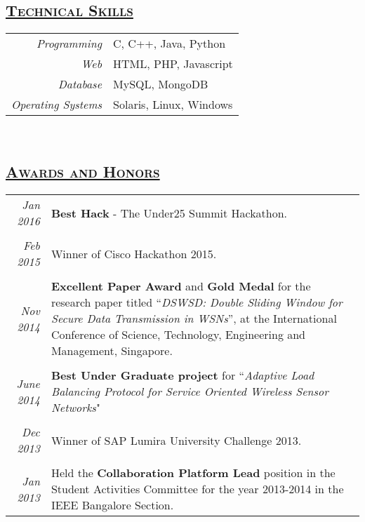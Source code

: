 \documentclass[14pt]{article}
\begin{document}
\subsection* {\scshape\LARGE\uline {Technical Skills}}
\begin{tabular}{r l}
\emph{Programming} & C, C++, Java, Python \\
\emph{Web}              & HTML, PHP, Javascript \\
\emph{Database}	  & MySQL, MongoDB \\
\emph{Operating Systems} & Solaris, Linux, Windows
\end{tabular}
\\
\subsection* {\scshape\LARGE\uline {Awards and Honors}}
\begin{tabularx}{\textwidth}{r X}
\emph{Jan 2016} &  \textbf{Best Hack} - The Under25 Summit Hackathon.\\ \\
\emph{Feb 2015} & Winner of Cisco Hackathon 2015.\\ \\
\emph{Nov 2014} & \textbf{Excellent Paper Award} and \textbf{Gold Medal} for the research paper  titled ``\emph{DSWSD: Double Sliding Window for Secure Data Transmission in WSNs}'', at the International Conference of Science, Technology, Engineering and Management, Singapore. \\ \\
\emph{June 2014} & \textbf{Best Under Graduate project} for ``\emph{Adaptive Load Balancing Protocol for Service Oriented Wireless Sensor Networks}" \\ \\
\emph{Dec 2013} & Winner of SAP Lumira University Challenge 2013. \\ \\
\emph{Jan 2013} & Held the \textbf{Collaboration Platform Lead} position in the Student Activities Committee for the year 2013-2014 in the IEEE Bangalore Section. 
\end{tabularx}
\\
\end{document}
